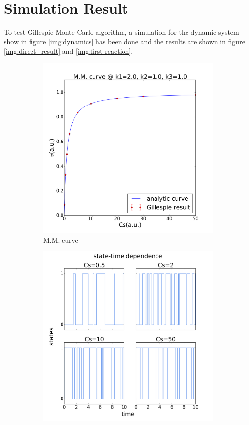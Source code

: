 \section{Simulation Result}
	To test Gillespie Monte Carlo algorithm, a simulation for the dynamic system show in figure \ref{img:dynamics} has been done and the results are shown in figure \ref{img:direct_result} and \ref{img:first-reaction}.
	\begin{figure}[H]
		\centering
		\begin{subfigure}{0.46\textwidth}
		\includegraphics[scale=0.33]{img/MM1.png}
		\caption{M.M. curve}
		\end{subfigure}
		\begin{subfigure}{0.46\textwidth}
		\includegraphics[scale=0.33]{img/state1.png}

\end{subfigure}
\end{figure}
